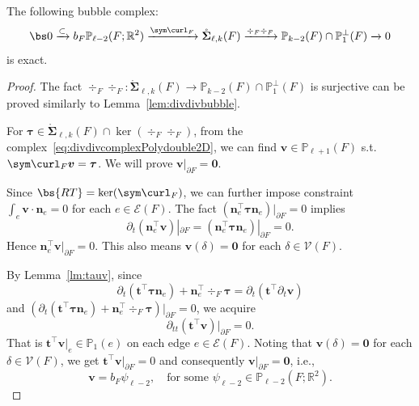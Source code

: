 \begin{lemma}
The following bubble complex: 
\begin{equation*}%
\bs0\xrightarrow{\subset} b_F\mathbb P_{\ell-2}(F;\mathbb R^2)\xrightarrow{\sym\curl_F} \mathring{\boldsymbol \Sigma}_{\ell,k}(F)\xrightarrow{\div_F\div_F} \mathbb P_{k-2}(F)\cap\mathbb P_1^{\perp}(F)\xrightarrow{}0
\end{equation*}
is exact.
\end{lemma}
\begin{proof}
The fact $\div_F\div_F: \mathring{\boldsymbol \Sigma}_{\ell,k}(F) \to \mathbb P_{k-2}(F)\cap\mathbb P_1^{\perp}(F)$ is surjective can be proved similarly to Lemma~\ref{lem:divdivbubble}. 

For $\boldsymbol \tau \in \mathring{\boldsymbol \Sigma}_{\ell,k}(F)\cap\ker(\div_F\div_F)$, from the complex~\eqref{eq:divdivcomplexPolydouble2D}, we can find $\boldsymbol v\in \mathbb P_{\ell+1}(F)$ s.t. $\sym \curl_F \boldsymbol v = \boldsymbol \tau$.  We will prove $\boldsymbol v|_{\partial F} = \boldsymbol 0$. 

Since $\bs{RT}=\ker(\sym\curl_F)$, we can further impose constraint $\int_e \boldsymbol v\cdot\boldsymbol n_{e}=0$ for each $e\in\mathcal E(F)$. The fact $(\boldsymbol n_{e}^{\intercal}\boldsymbol \tau\boldsymbol  n_{e})|_{\partial F}=0$ implies
\[
\partial_t(\boldsymbol  n_{e}^{\intercal}\boldsymbol  v)|_{\partial F}= (\boldsymbol  n_{e}^{\intercal}\boldsymbol \tau\boldsymbol  n_{e})|_{\partial F}=0.
\]
Hence $\boldsymbol  n_{e}^{\intercal}\boldsymbol  v|_{\partial F}=0$.
This also means $\boldsymbol  v(\delta)=\boldsymbol 0$ for each $\delta\in\mathcal V(F)$.


By Lemma~\ref{lm:tauv}, since
\begin{equation*}%
\partial_{t}(\boldsymbol  t^{\intercal}\boldsymbol \tau\boldsymbol  n_{e})+\boldsymbol  n_{e}^{\intercal}\div_F\boldsymbol \tau= \partial_t(\boldsymbol  t^{\intercal}\partial_t\boldsymbol  v)
\end{equation*}
and $(\partial_{t}(\boldsymbol  t^{\intercal}\boldsymbol \tau\boldsymbol  n_{e})+\boldsymbol  n_{e}^{\intercal}\div_F\boldsymbol \tau)|_{\partial F}=0$, we acquire
\[
\partial_{tt}(\boldsymbol  t^{\intercal}\boldsymbol  v)|_{\partial F}=0.
\]
That is $\boldsymbol  t^{\intercal}\boldsymbol  v|_e\in\mathbb P_1(e)$ on each edge $e\in\mathcal E(F)$. Noting that $\boldsymbol  v(\delta)=\boldsymbol 0$ for each $\delta\in\mathcal V(F)$, we get $\boldsymbol t^{\intercal}\boldsymbol  v|_{\partial F}=0$ and consequently $\boldsymbol  v|_{\partial F}=\boldsymbol 0$, i.e., 
$$
\boldsymbol v = b_F\psi_{\ell-2},\quad \text{for some } \psi_{\ell-2} \in \mathbb P_{\ell-2}(F;\mathbb R^2).
$$
\end{proof}


